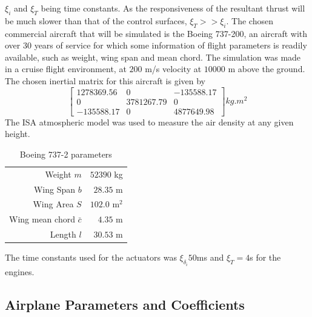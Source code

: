$\xi_i$ and $\xi_T$ being time constants. As the responsiveness of the resultant thrust will be much slower than that of the control surfaces, $\xi_T>>\xi_i$.
The chosen commercial aircraft that will be simulated is the Boeing 737-200, an aircraft with over 30 years of service for which some information of flight parameters is readily available, such as weight, wing span and mean chord. The simulation was made in a cruise flight environment, at $200$ m/s velocity at $10000$ m above the ground. The chosen inertial matrix for this aircraft is given by
\begin{equation}
\begin{bmatrix}
1278369.56 & 0 & -135588.17\\
0 & 3781267.79 & 0\\
-135588.17 & 0 & 4877649.98
\end{bmatrix}
kg.m^2
\end{equation}
The ISA atmospheric model was used to measure the air density at any given height.
\begin{table}[htbp]
  \centering
  \caption{Boeing 737-2 parameters}
    \begin{tabular}{rr}
    \toprule
    Weight $m$ & $52390$ kg \\
    Wing Span $b$ & $28.35$ m \\
    Wing Area $S$ & $102.0$ m$^{2}$ \\
    Wing mean chord $\bar{c}$ & $4.35$ m \\
    Length $l$ & $30.53$ m \\
    \bottomrule
    \end{tabular}%
  \label{tab:b737_parameters}
\end{table}%
The time constants used for the actuators was $\xi_{\delta_i}50$ms and $\xi_T=4$s for the engines.
\subsection{Airplane Parameters and Coefficients}
\label{section:model/plane_dynamics}

